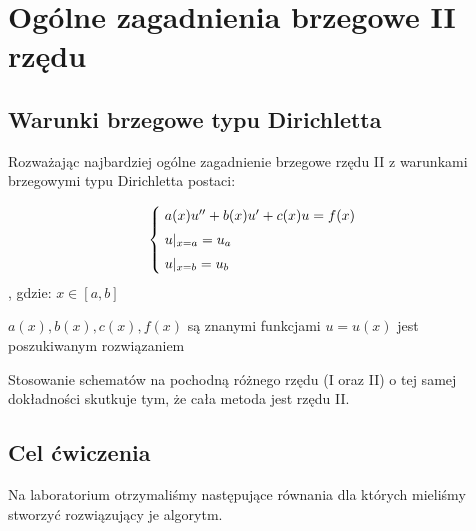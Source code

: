 \section{Ogólne zagadnienia brzegowe II rzędu}
\subsection{Warunki brzegowe typu Dirichletta}

Rozważając najbardziej ogólne zagadnienie brzegowe rzędu II z warunkami brzegowymi typu Dirichletta postaci:

\[
\begin{cases}
\vspace{0.1cm} 
\hspace{0,1cm} a(x) u'' + b(x)u' + c(x)u =f(x) \\
\vspace{0.1cm}
\hspace{0,1cm}u|_{x=a} = u_{a} \\
\hspace{0,1cm}u|_{x=b} = u_{b}
\end{cases}
\]
, gdzie:
$x\in[a,b]$

$a(x), b(x), c(x), f(x)$ są znanymi funkcjami
\newline
$u = u(x)$ jest poszukiwanym rozwiązaniem
\newline

Stosowanie schematów na pochodną różnego rzędu (I oraz II) o tej samej dokładności skutkuje tym, że cała metoda jest rzędu II.

\subsection{Cel ćwiczenia}
Na laboratorium otrzymaliśmy następujące równania dla których mieliśmy stworzyć rozwiązujący je algorytm.

